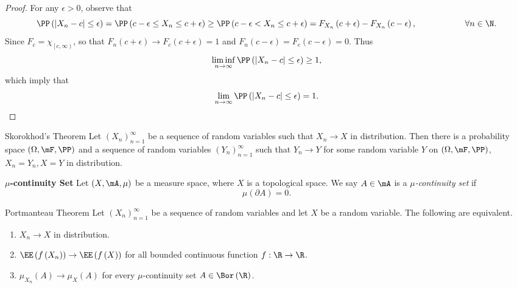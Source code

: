 \documentclass[stat901]{subfiles}
\begin{document}
    \begin{proof}
        For any $\epsilon>0$, observe that
        \begin{equation*}
            \PP\left( \left| X_n-c \right|\leq\epsilon \right) = \PP\left( c-\epsilon\leq X_n\leq c+\epsilon \right) \geq \PP\left( c-\epsilon<X_n\leq c+\epsilon \right) = F_{X_n}\left( c+\epsilon \right)-F_{X_n}\left( c-\epsilon \right),\hspace{2cm}\forall n\in\N.
        \end{equation*}
        Since $F_c = \chi_{\left[ c,\infty \right)}$, so that $F_n\left( c+\epsilon \right) \to F_c\left( c+\epsilon \right) = 1$ and $F_n\left( c-\epsilon \right) = F_c\left( c-\epsilon \right) = 0$. Thus
        \begin{equation*}
            \liminf_{n\to\infty} \PP\left( \left| X_n-c \right|\leq\epsilon \right) \geq 1,
        \end{equation*}
        which imply that
        \begin{equation*}
            \lim_{n\to\infty}\PP\left( \left| X_n-c \right|\leq\epsilon \right) = 1.
        \end{equation*}
    \end{proof}

    \begin{theorem}{Skorokhod's Theorem}
        Let $\left( X_{n} \right)^{\infty}_{n=1}$ be a sequence of random variables such that $X_n\to X$ in distribution. Then there is a probability space $\left( \Omega,\mF,\PP \right)$ and a sequence of random variables $\left( Y_n \right)^{\infty}_{n=1}$ such that $Y_n\to Y$ for some random variable $Y$ on $\left( \Omega,\mF,\PP \right)$, $X_n=Y_n, X=Y$ in distribution.
    \end{theorem}

    \rruleline

    \begin{definition}{\textbf{$\mu$-continuity Set}}
        Let $\left( X,\mA,\mu \right)$ be a measure space, where $X$ is a topological space. We say $A\in\mA$ is a \emph{$\mu$-continuity set} if
        \begin{equation*}
            \mu\left( \partial A \right) = 0.
        \end{equation*}
    \end{definition}

    \begin{theorem}{Portmanteau Theorem}
        Let $\left( X_{n} \right)^{\infty}_{n=1}$ be a sequence of random variables and let $X$ be a random variable. The following are equivalent.
        \begin{enumerate}
            \item $X_n\to X$ in distribution.
            \item $\EE\left( f\left( X_n \right) \right)\to\EE\left( f\left( X \right) \right)$ for all bounded continuous function $f:\R\to\R$.
            \item $\mu_{X_n}\left( A \right)\to\mu_X\left( A \right)$ for every $\mu$-continuity set $A\in\Bor\left( \R \right)$.
        \end{enumerate}
    \end{theorem}
\end{document}
